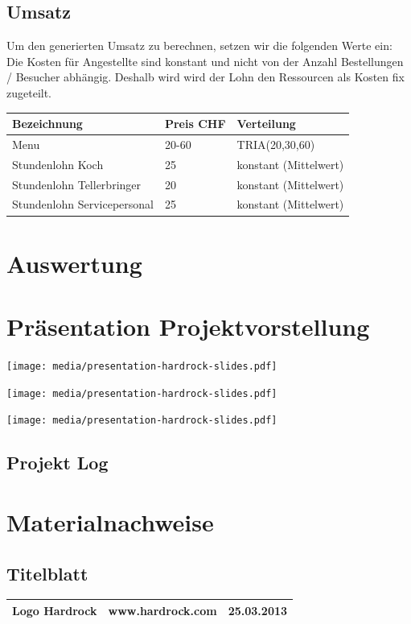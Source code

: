 \documentclass[ngerman,a4paper,12pt]{scrreprt}
\begin{document}
	\section{Umsatz}
\noindent
	Um den generierten Umsatz zu berechnen, setzen wir die folgenden Werte ein:
Die Kosten für Angestellte sind konstant und nicht von der Anzahl Bestellungen / Besucher abhängig. Deshalb wird wird der Lohn den Ressourcen als Kosten fix zugeteilt.

\begin{tabularx}{\textwidth}{|l|l|X|}
		\hline
		\textbf{Bezeichnung} & \textbf{Preis CHF} & \textbf{Verteilung}  \\
		\hline
		Menu & 20-60 & TRIA(20,30,60)  \\
		\hline
		Stundenlohn Koch & 25 & konstant (Mittelwert)\\
		Stundenlohn Tellerbringer & 20 & konstant (Mittelwert) \\
		Stundenlohn Servicepersonal & 25 & konstant (Mittelwert)\\
		\hline
\end{tabularx}
	
\chapter{Auswertung}



\appendix
\chapter{Präsentation Projektvorstellung}
\begin{center}
	\texttt{[image: media/presentation-hardrock-slides.pdf]}
\end{center}
\begin{center}
	\texttt{[image: media/presentation-hardrock-slides.pdf]}
\end{center}
\begin{center}
	\texttt{[image: media/presentation-hardrock-slides.pdf]}
\end{center}
%

\listoffigures

\begin{landscape}
\chapter{Projekt Log}

\end{landscape}

\chapter{Materialnachweise}
\section{Titelblatt}
\begin{tabularx}{\textwidth}{|Xlr|}
		\hline
		Logo Hardrock & www.hardrock.com & 25.03.2013 \\
		\hline
\end{tabularx}
\end{document}
